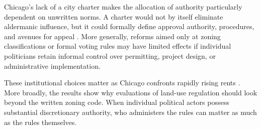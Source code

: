 Chicago's lack of a city charter makes the allocation of authority particularly dependent on unwritten norms.
A charter would not by itself eliminate aldermanic influence, but it could formally define approval authority, procedures, and avenues for appeal \citep{mcclintock_what_2025}.
More generally, reforms aimed only at zoning classifications or formal voting rules may have limited effects if individual politicians retain informal control over permitting, project design, or administrative implementation.

These institutional choices matter as Chicago confronts rapidly rising rents \citep{davis_chicagos_2026}.
More broadly, the results show why evaluations of land-use regulation should look beyond the written zoning code.
When individual political actors possess substantial discretionary authority, who administers the rules can matter as much as the rules themselves.
